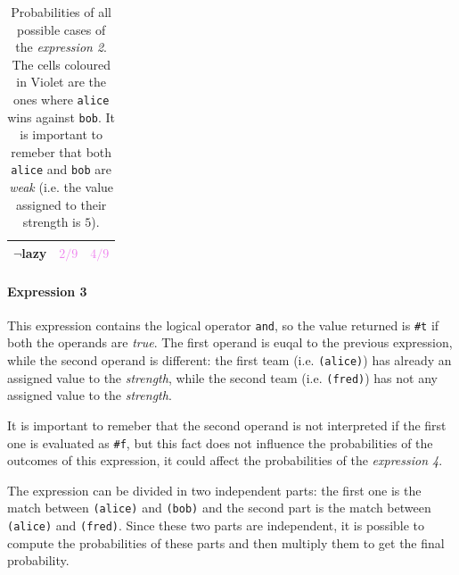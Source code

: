 \begin{itemize}
\begin{table}[H]
\begin{tabular}{| c | c c|}
                    \textbf{$\neg$lazy} & \textcolor{Violet}{$2/9$} & \textcolor{Violet}{$4/9$} \\ 
                    \hline
                \end{tabular}
            \egroup
            \caption{
                Probabilities of all possible cases of the \textit{expression 2}. The cells coloured in Violet are the ones where
                \texttt{\textquotesingle alice} wins against \texttt{\textquotesingle bob}.
                It is important to remeber that both \texttt{\textquotesingle alice} and \texttt{\textquotesingle bob} are \textit{weak} (i.e. the value assigned to
                their strength is $5$).
            }
            \label{tab:exp-2}
        \end{table}

        \paragraph*{Expression 3} This expression contains the logical operator \texttt{and}, so the value returned is \texttt{\#t}
        if both the operands are \textit{true}. The first operand is euqal to the previous expression, while the second operand
        is different: the first team (i.e. \texttt{\textquotesingle (alice)}) has already an assigned value to the \textit{strength}, while the second 
        team (i.e. \texttt{\textquotesingle (fred)}) has not any assigned value to the \textit{strength}.

        It is important to remeber that the second operand is not interpreted if the first one is evaluated as \texttt{\#f}, but this
        fact does not influence the probabilities of the outcomes of this expression, it could affect the probabilities of the
        \textit{expression 4}.

        The expression can be divided in two independent parts: the first one is the match between \texttt{\textquotesingle (alice)} and 
        \texttt{\textquotesingle (bob)} and the second part is the match between \texttt{\textquotesingle (alice)} and \texttt{\textquotesingle (fred)}. 
        Since these two parts are independent, it is possible to compute the probabilities of these parts and then multiply them to
        get the final probability.
        

\end{itemize}
